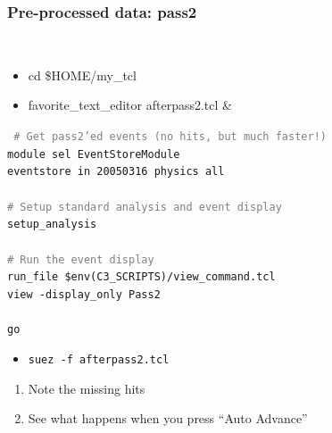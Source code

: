 \documentclass[12pt,compress]{beamer}
\begin{document}
\begin{frame}
\frametitle{Pre-processed data: pass2}

{\tt \scriptsize
\begin{itemize}
\item cd \$HOME/my\_tcl
\item favorite\_text\_editor afterpass2.tcl \&
\end{itemize}}

\begin{minipage}{\linewidth}
\mbox{\hspace{1.2 cm}} \begin{minipage}{0.9\linewidth}
\tt \scriptsize
\textcolor{gray}{\# Get pass2'ed events (no hits, but much faster!)} \\
module sel EventStoreModule \\
eventstore in 20050316 physics all \\
\mbox{ } \\
\textcolor{gray}{\# Setup standard analysis and event display} \\
setup\_analysis \\
\mbox{ } \\
\textcolor{gray}{\# Run the event display} \\
run\_file \$env(C3\_SCRIPTS)/view\_command.tcl \\
view -display\_only Pass2 \\
\mbox{ } \\
go
\end{minipage}
\end{minipage}

\begin{itemize}
\item {\tt \scriptsize suez -f afterpass2.tcl}
\end{itemize}

\begin{enumerate}
\item Note the missing hits
\item See what happens when you press ``Auto Advance''
\end{enumerate}
\end{frame}
\end{document}
